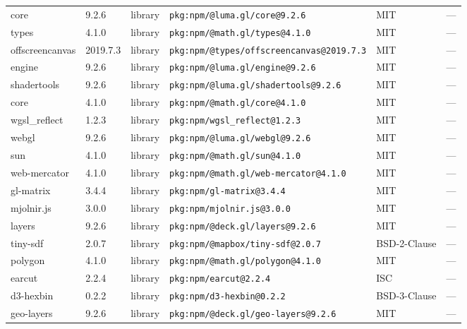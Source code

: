 \documentclass[11pt,a4paper]{article}
\begin{document}
\begin{longtable}{|p{4cm}|p{2cm}|p{1.6cm}|p{5cm}|p{1.5cm}|p{3.5cm}|}
\raggedright core & 9.2.6 & library & \small\texttt{pkg:npm/@luma.gl/core@9.2.6} & MIT & \small — \\
\raggedright types & 4.1.0 & library & \small\texttt{pkg:npm/@math.gl/types@4.1.0} & MIT & \small — \\
\raggedright offscreencanvas & 2019.7.3 & library & \small\texttt{pkg:npm/@types/offscreencanvas@2019.7.3} & MIT & \small — \\
\raggedright engine & 9.2.6 & library & \small\texttt{pkg:npm/@luma.gl/engine@9.2.6} & MIT & \small — \\
\raggedright shadertools & 9.2.6 & library & \small\texttt{pkg:npm/@luma.gl/shadertools@9.2.6} & MIT & \small — \\
\raggedright core & 4.1.0 & library & \small\texttt{pkg:npm/@math.gl/core@4.1.0} & MIT & \small — \\
\raggedright wgsl\_reflect & 1.2.3 & library & \small\texttt{pkg:npm/wgsl\_reflect@1.2.3} & MIT & \small — \\
\raggedright webgl & 9.2.6 & library & \small\texttt{pkg:npm/@luma.gl/webgl@9.2.6} & MIT & \small — \\
\raggedright sun & 4.1.0 & library & \small\texttt{pkg:npm/@math.gl/sun@4.1.0} & MIT & \small — \\
\raggedright web-mercator & 4.1.0 & library & \small\texttt{pkg:npm/@math.gl/web-mercator@4.1.0} & MIT & \small — \\
\raggedright gl-matrix & 3.4.4 & library & \small\texttt{pkg:npm/gl-matrix@3.4.4} & MIT & \small — \\
\raggedright mjolnir.js & 3.0.0 & library & \small\texttt{pkg:npm/mjolnir.js@3.0.0} & MIT & \small — \\
\raggedright layers & 9.2.6 & library & \small\texttt{pkg:npm/@deck.gl/layers@9.2.6} & MIT & \small — \\
\raggedright tiny-sdf & 2.0.7 & library & \small\texttt{pkg:npm/@mapbox/tiny-sdf@2.0.7} & BSD-2-Clause & \small — \\
\raggedright polygon & 4.1.0 & library & \small\texttt{pkg:npm/@math.gl/polygon@4.1.0} & MIT & \small — \\
\raggedright earcut & 2.2.4 & library & \small\texttt{pkg:npm/earcut@2.2.4} & ISC & \small — \\
\raggedright d3-hexbin & 0.2.2 & library & \small\texttt{pkg:npm/d3-hexbin@0.2.2} & BSD-3-Clause & \small — \\
\raggedright geo-layers & 9.2.6 & library & \small\texttt{pkg:npm/@deck.gl/geo-layers@9.2.6} & MIT & \small — \\

\end{longtable}
\end{document}
